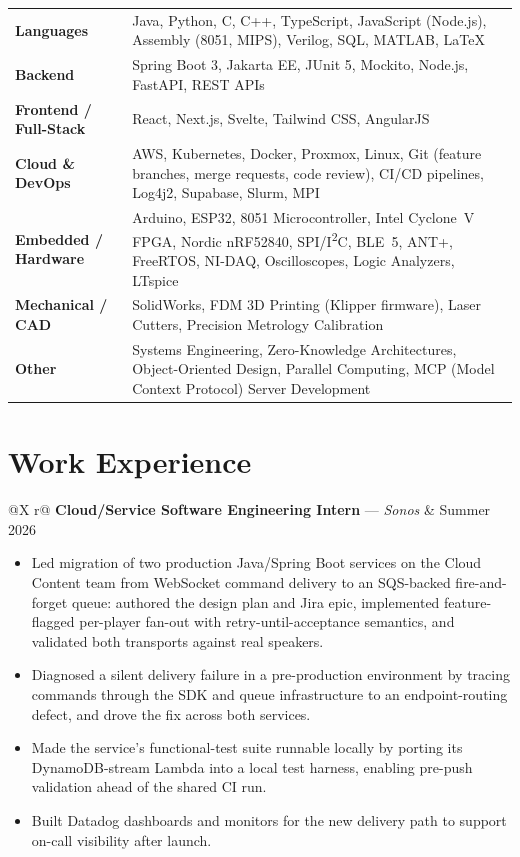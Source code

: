 \documentclass[10pt, letterpaper]{article}
\makeatletter
\newcommand{\cventry}[4]{%
  \begin{tabularx}{\linewidth}{@{}X r@{}}
    \textbf{#1} \textnormal{---} \textit{#2} & \textnormal{#4} \\
    \multicolumn{2}{@{}l@{}}{\small #3}
  \end{tabularx}\vspace{1pt}}
\makeatother
\begin{document}
\begin{tabularx}{\linewidth}{@{} l X @{}}
  \textbf{Languages} &
    Java, Python, C, C++, TypeScript, JavaScript (Node.js), Assembly (8051, MIPS), Verilog,
    SQL, MATLAB, \LaTeX \\[3pt]
  \textbf{Backend} &
    Spring Boot 3, Jakarta EE, JUnit 5, Mockito, Node.js, FastAPI, REST APIs \\[3pt]
  \textbf{Frontend / Full-Stack} &
    React, Next.js, Svelte, Tailwind CSS, AngularJS \\[3pt]
  \textbf{Cloud \& DevOps} &
    AWS, Kubernetes, Docker, Proxmox, Linux, Git (feature branches, merge requests, code review),
    CI/CD pipelines, Log4j2, Supabase, Slurm, MPI \\[3pt]
  \textbf{Embedded / Hardware} &
    Arduino, ESP32, 8051 Microcontroller, Intel Cyclone~V FPGA, Nordic nRF52840,
    SPI/I\textsuperscript{2}C, BLE~5, ANT+, FreeRTOS, NI-DAQ, Oscilloscopes, Logic Analyzers,
    LTspice \\[3pt]
  \textbf{Mechanical / CAD} &
    SolidWorks, FDM 3D Printing (Klipper firmware), Laser Cutters, Precision Metrology
    Calibration \\[3pt]
  \textbf{Other} &
    Systems Engineering, Zero-Knowledge Architectures, Object-Oriented Design,
    Parallel Computing, MCP (Model Context Protocol) Server Development
\end{tabularx}

\section{Work Experience}

\cventry{Cloud/Service Software Engineering Intern}{Sonos}{Boston, MA}{Summer 2026}
\begin{itemize}
  \item Led migration of two production Java/Spring Boot services on the Cloud Content team from
        WebSocket command delivery to an SQS-backed fire-and-forget queue: authored the design plan
        and Jira epic, implemented feature-flagged per-player fan-out with retry-until-acceptance
        semantics, and validated both transports against real speakers.
  \item Diagnosed a silent delivery failure in a pre-production environment by tracing commands
        through the SDK and queue infrastructure to an endpoint-routing defect, and drove the fix
        across both services.
  \item Made the service's functional-test suite runnable locally by porting its DynamoDB-stream
        Lambda into a local test harness, enabling pre-push validation ahead of the shared CI run.
  \item Built Datadog dashboards and monitors for the new delivery path to support on-call
        visibility after launch.
\end{itemize}
\end{document}
